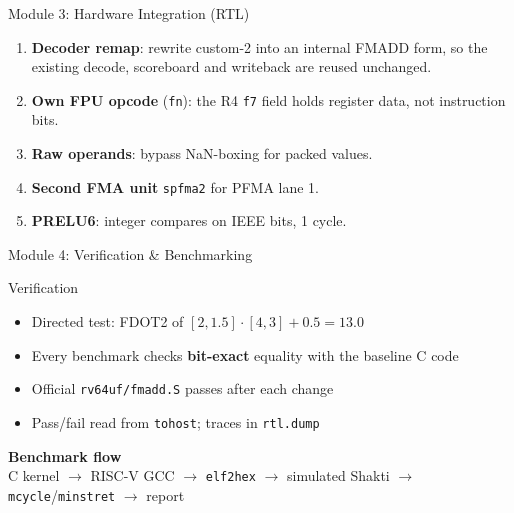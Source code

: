 \documentclass[aspectratio=169,11pt]{beamer}
\begin{document}
\begin{frame}{Module 3: Hardware Integration (RTL)}
  \vfill
  \centering
  \begin{minipage}{0.82\textwidth}
    \begin{enumerate}\setlength{\itemsep}{3mm}
      \item \textbf{Decoder remap}: rewrite custom-2 into an internal FMADD form,
            so the existing decode, scoreboard and writeback are reused unchanged.
      \item \textbf{Own FPU opcode} (\texttt{fn}): the R4 \texttt{f7} field holds
            register data, not instruction bits.
      \item \textbf{Raw operands}: bypass NaN-boxing for packed values.
      \item \textbf{Second FMA unit} \texttt{spfma2} for PFMA lane 1.
      \item \textbf{PRELU6}: integer compares on IEEE bits, 1 cycle.
    \end{enumerate}
  \end{minipage}
  \vfill
\end{frame}

\begin{frame}{Module 4: Verification \& Benchmarking}
  \vfill
  \centering
  \begin{minipage}{0.8\textwidth}
    \begin{block}{Verification}
      \begin{itemize}\setlength{\itemsep}{2mm}
        \item Directed test: FDOT2 of $[2,1.5]\cdot[4,3]+0.5 = 13.0$ \checkmark
        \item Every benchmark checks \textbf{bit-exact} equality with the
              baseline C code
        \item Official \texttt{rv64uf/fmadd.S} passes after each change
        \item Pass/fail read from \texttt{tohost}; traces in \texttt{rtl.dump}
      \end{itemize}
    \end{block}
  \end{minipage}
  \vspace{5mm}

  \textbf{Benchmark flow}\\[1mm]
  \small C kernel $\rightarrow$ RISC-V GCC $\rightarrow$
  \texttt{elf2hex} $\rightarrow$ simulated Shakti $\rightarrow$
  \texttt{mcycle}/\texttt{minstret} $\rightarrow$ report
  \vfill
\end{frame}
\end{document}

